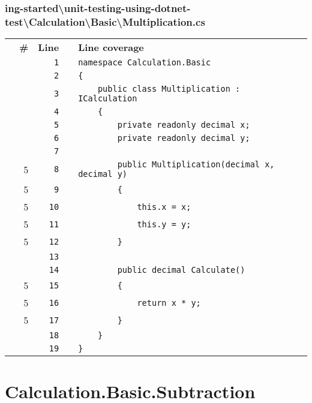 \documentclass[a4paper,landscape,10pt]{article}
\begin{document}
\subsubsection{ing-started\textbackslash unit-testing-using-dotnet-test\textbackslash Calculation\textbackslash Basic\textbackslash Multiplication.cs}
\begin{longtable}[l]{lrrll}
\textbf{} & \textbf{\#} & \textbf{Line} & \textbf{} & \textbf{Line coverage}\\
\cellcolor{gray} &  & \verb~1~ & & \verb~namespace Calculation.Basic~\\
\cellcolor{gray} &  & \verb~2~ & & \verb~{~\\
\cellcolor{gray} &  & \verb~3~ & & \verb~    public class Multiplication : ICalculation~\\
\cellcolor{gray} &  & \verb~4~ & & \verb~    {~\\
\cellcolor{gray} &  & \verb~5~ & & \verb~        private readonly decimal x;~\\
\cellcolor{gray} &  & \verb~6~ & & \verb~        private readonly decimal y;~\\
\cellcolor{gray} &  & \verb~7~ & & \verb~~\\
\cellcolor{green} & 5 & \verb~8~ & & \verb~        public Multiplication(decimal x, decimal y)~\\
\cellcolor{green} & 5 & \verb~9~ & & \verb~        {~\\
\cellcolor{green} & 5 & \verb~10~ & & \verb~            this.x = x;~\\
\cellcolor{green} & 5 & \verb~11~ & & \verb~            this.y = y;~\\
\cellcolor{green} & 5 & \verb~12~ & & \verb~        }~\\
\cellcolor{gray} &  & \verb~13~ & & \verb~~\\
\cellcolor{gray} &  & \verb~14~ & & \verb~        public decimal Calculate()~\\
\cellcolor{green} & 5 & \verb~15~ & & \verb~        {~\\
\cellcolor{green} & 5 & \verb~16~ & & \verb~            return x * y;~\\
\cellcolor{green} & 5 & \verb~17~ & & \verb~        }~\\
\cellcolor{gray} &  & \verb~18~ & & \verb~    }~\\
\cellcolor{gray} &  & \verb~19~ & & \verb~}~\\
\end{longtable}
\newpage
\section{Calculation.Basic.Subtraction}
\end{document}
